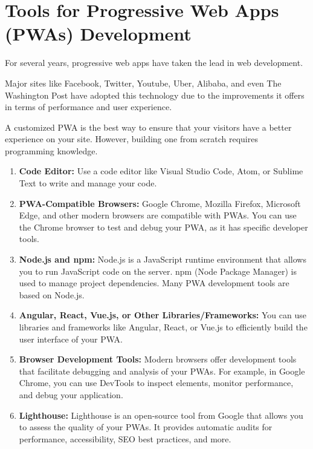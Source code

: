 \documentclass{article}
\begin{document}
\section*{Tools for Progressive Web Apps (PWAs) Development}

For several years, progressive web apps have taken the lead in web development.

Major sites like Facebook, Twitter, Youtube, Uber, Alibaba, and even The Washington Post have adopted this technology due to the improvements it offers in terms of performance and user experience.

A customized PWA is the best way to ensure that your visitors have a better experience on your site. However, building one from scratch requires programming knowledge.

\begin{enumerate}
    \item \textbf{Code Editor:} Use a code editor like Visual Studio Code, Atom, or Sublime Text to write and manage your code.
    
    \item \textbf{PWA-Compatible Browsers:} Google Chrome, Mozilla Firefox, Microsoft Edge, and other modern browsers are compatible with PWAs. You can use the Chrome browser to test and debug your PWA, as it has specific developer tools.
    
    \item \textbf{Node.js and npm:} Node.js is a JavaScript runtime environment that allows you to run JavaScript code on the server. npm (Node Package Manager) is used to manage project dependencies. Many PWA development tools are based on Node.js.
    
    \item \textbf{Angular, React, Vue.js, or Other Libraries/Frameworks:} You can use libraries and frameworks like Angular, React, or Vue.js to efficiently build the user interface of your PWA.
    
    \item \textbf{Browser Development Tools:} Modern browsers offer development tools that facilitate debugging and analysis of your PWAs. For example, in Google Chrome, you can use DevTools to inspect elements, monitor performance, and debug your application.
    
    \item \textbf{Lighthouse:} Lighthouse is an open-source tool from Google that allows you to assess the quality of your PWAs. It provides automatic audits for performance, accessibility, SEO best practices, and more.
    

\end{enumerate}
\end{document}
